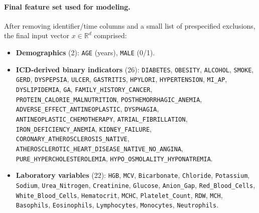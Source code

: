 \documentclass[diagnostics,article,submit,pdftex,moreauthors]{Definitions/mdpi}
\begin{document}
\paragraph{Final feature set used for modeling.}
After removing identifier/time columns and a small list of prespecified exclusions, the final input vector $x\in\mathbb{R}^d$ comprised:
\begin{itemize}[leftmargin=12pt,topsep=2pt,itemsep=1pt]
  \item \textbf{Demographics} (2): \texttt{AGE} (years), \texttt{MALE} (0/1).
  \item \textbf{ICD-derived binary indicators} (26): \texttt{DIABETES}, \texttt{OBESITY}, \texttt{ALCOHOL}, \texttt{SMOKE}, \texttt{GERD}, \texttt{DYSPEPSIA}, \texttt{ULCER}, \texttt{GASTRITIS}, \texttt{HPYLORI}, \texttt{HYPERTENSION}, \texttt{MI\_AP}, \texttt{DYSLIPIDEMIA}, \texttt{GA}, \texttt{FAMILY\_HISTORY\_CANCER}, \texttt{PROTEIN\_CALORIE\_MALNUTRITION}, \texttt{POSTHEMORRHAGIC\_ANEMIA}, \texttt{ADVERSE\_EFFECT\_ANTINEOPLASTIC}, \texttt{DYSPHAGIA}, \texttt{ANTINEOPLASTIC\_CHEMOTHERAPY}, \texttt{ATRIAL\_FIBRILLATION}, \texttt{IRON\_DEFICIENCY\_ANEMIA}, \texttt{KIDNEY\_FAILURE}, \texttt{CORONARY\_ATHEROSCLEROSIS\_NATIVE}, \texttt{ATHEROSCLEROTIC\_HEART\_DISEASE\_NATIVE\_NO\_ANGINA}, \texttt{PURE\_HYPERCHOLESTEROLEMIA}, \texttt{HYPO\_OSMOLALITY\_HYPONATREMIA}.
  \item \textbf{Laboratory variables} (22): \texttt{HGB}, \texttt{MCV}, \texttt{Bicarbonate}, \texttt{Chloride}, \texttt{Potassium}, \texttt{Sodium}, \texttt{Urea\_Nitrogen}, \texttt{Creatinine}, \texttt{Glucose}, \texttt{Anion\_Gap}, \texttt{Red\_Blood\_Cells}, \texttt{White\_Blood\_Cells}, \texttt{Hematocrit}, \texttt{MCHC}, \texttt{Platelet\_Count}, \texttt{RDW}, \texttt{MCH}, \texttt{Basophils}, \texttt{Eosinophils}, \texttt{Lymphocytes}, \texttt{Monocytes}, \texttt{Neutrophils}.
\end{itemize}



\end{document}
